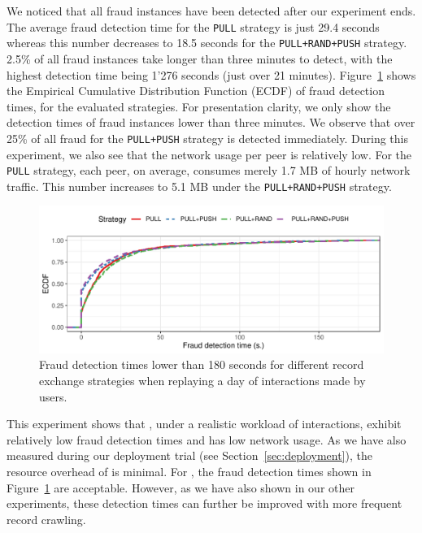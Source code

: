 We noticed that all fraud instances have been detected after our experiment ends.
The average fraud detection time for the \texttt{PULL} strategy is just 29.4 seconds whereas this number decreases to 18.5 seconds for the \texttt{PULL+RAND+PUSH} strategy.
2.5\% of all fraud instances take longer than three minutes to detect, with the highest detection time being 1'276 seconds (just over 21 minutes).
Figure~\ref{fig:fraud_times_realistic_dataset} shows the Empirical Cumulative Distribution Function (ECDF) of fraud detection times, for the evaluated strategies.
For presentation clarity, we only show the detection times of fraud instances lower than three minutes.
We observe that over 25\% of all fraud for the \texttt{PULL+PUSH} strategy is detected immediately.
During this experiment, we also see that the network usage per peer is relatively low.
For the \texttt{PULL} strategy, each peer, on average, consumes merely 1.7 MB of hourly network traffic.
This number increases to 5.1 MB under the \texttt{PULL+RAND+PUSH} strategy.

\begin{figure}[t]
	\centering
	\includegraphics[width=\linewidth]{trustchain/assets/fraud_experiment_realistic_ecdf}
	\caption{Fraud detection times lower than 180 seconds for different record exchange strategies when replaying a day of interactions made by \Tribler{} users.}
	\label{fig:fraud_times_realistic_dataset}
\end{figure}

This experiment shows that \TrustChain{}, under a realistic workload of \Tribler{} interactions, exhibit relatively low fraud detection times and has low network usage.
As we have also measured during our deployment trial (see Section~\ref{sec:deployment}), the resource overhead of \TrustChain{} is minimal.
For \Tribler{}, the fraud detection times shown in Figure~\ref{fig:fraud_times_realistic_dataset} are acceptable.
However, as we have also shown in our other experiments, these detection times can further be improved with more frequent record crawling.

